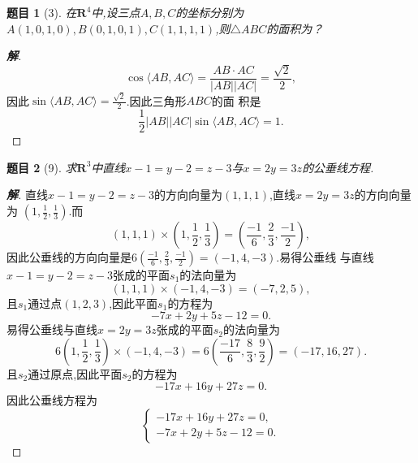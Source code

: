 ﻿\documentclass[a4paper]{article}
\newtheorem*{exe}{题目}
\newenvironment{exercise}
{\bigskip\begin{mdframed}\begin{exe}}
    {\end{exe}\end{mdframed}\bigskip}
\numberwithin{equation}{section}
\begin{document}
\begin{exercise}[3]
在$\mathbf{R}^4$中,设三点$A,B,C$的坐标分别为
$A(1,0,1,0),B(0,1,0,1),C(1,1,1,1)$,则$\triangle ABC$的面积为？  
\end{exercise}
\begin{proof}[\textbf{解}]
$$
\cos \langle AB,AC\rangle=\frac{AB\cdot AC}{|AB||AC|}=\frac{\sqrt{2}}{2},
$$
因此$\sin \langle AB,AC\rangle=\frac{\sqrt{2}}{2}$.因此三角形$ABC$的面
积是
$$
\frac{1}{2}|AB||AC|\sin \langle AB,AC\rangle=1.
$$
\end{proof}
\begin{exercise}[9]
求$\mathbf{R}^3$中直线$x-1=y-2=z-3$与$x=2y=3z$的公垂线方程.  
\end{exercise}
\begin{proof}[\textbf{解}]
直线$x-1=y-2=z-3$的方向向量为$(1,1,1)$,直线$x=2y=3z$的方向向量为
$(1,\frac{1}{2},\frac{1}{3})$.而
$$
(1,1,1)\times (1,\frac{1}{2},\frac{1}{3})=(\frac{-1}{6},\frac{2}{3},\frac{-1}{2}),
$$
因此公垂线的方向向量是$6(\frac{-1}{6},\frac{2}{3},\frac{-1}{2})=(-1,4,-3)$.易得公垂线
与直线$x-1=y-2=z-3$张成的平面$s_{1}$的法向量为
$$
(1,1,1)\times (-1,4,-3)=(-7,2,5),
$$
且$s_1$通过点$(1,2,3)$,因此平面$s_1$的方程为
$$
-7x+2y+5z-12=0.
$$
易得公垂线与直线$x=2y=3z$张成的平面$s_2$的法向量为
$$
6(1,\frac{1}{2},\frac{1}{3})\times (-1,4,-3)=6(\frac{-17}{6},\frac{8}{3},\frac{9}{2})=(-17,16,27).
$$
且$s_2$通过原点,因此平面$s_2$的方程为
$$
-17x+16y+27z=0.
$$
因此公垂线方程为
$$
\begin{cases}
  -17x+16y+27z=0,\\
-7x+2y+5z-12=0.
\end{cases}
$$
\end{proof}
\end{document}
